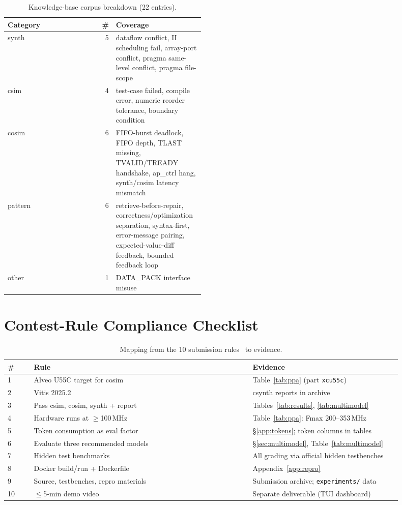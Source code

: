 \documentclass[10pt,conference,letterpaper]{IEEEtran}
\begin{document}
\begin{table}[h]
\centering
\caption{Knowledge-base corpus breakdown (22 entries).}
\label{tab:kb}
\small
\begin{tabular}{lr p{0.45\linewidth}}
\toprule
\textbf{Category} & \textbf{\#} & \textbf{Coverage} \\
\midrule
synth & 5 & dataflow conflict, II scheduling fail, array-port conflict, pragma same-level conflict, pragma file-scope \\
csim & 4 & test-case failed, compile error, numeric reorder tolerance, boundary condition \\
cosim & 6 & FIFO-burst deadlock, FIFO depth, TLAST missing, TVALID/TREADY handshake, ap\_ctrl hang, synth/cosim latency mismatch \\
pattern & 6 & retrieve-before-repair, correctness/optimization separation, syntax-first, error-message pairing, expected-value-diff feedback, bounded feedback loop \\
other & 1 & DATA\_PACK interface misuse \\
\bottomrule
\end{tabular}
\end{table}

\section{Contest-Rule Compliance Checklist}
\label{app:compliance}

\begin{table}[h]
\centering
\caption{Mapping from the 10 submission rules~\cite{fpt26rules} to evidence.}
\label{tab:compliance}
\footnotesize
\begin{tabular}{p{0.06\linewidth} p{0.5\linewidth} p{0.34\linewidth}}
\toprule
\textbf{\#} & \textbf{Rule} & \textbf{Evidence} \\
\midrule
1 & Alveo U55C target for cosim & Table~\ref{tab:ppa} (part \texttt{xcu55c}) \\
2 & Vitis 2025.2 & csynth reports in archive \\
3 & Pass csim, cosim, synth + report & Tables~\ref{tab:results}, \ref{tab:multimodel} \\
4 & Hardware runs at $\geq$100\,MHz & Table~\ref{tab:ppa}: Fmax 200--353\,MHz \\
5 & Token consumption as eval factor & \S\ref{app:tokens}; token columns in tables \\
6 & Evaluate three recommended models & \S\ref{sec:multimodel}, Table~\ref{tab:multimodel} \\
7 & Hidden test benchmarks & All grading via official hidden testbenches \\
8 & Docker build/run + Dockerfile & Appendix~\ref{app:repro} \\
9 & Source, testbenches, repro materials & Submission archive; \texttt{experiments/} data \\
10 & $\leq$5-min demo video & Separate deliverable (TUI dashboard) \\
\bottomrule
\end{tabular}
\end{table}
\end{document}
